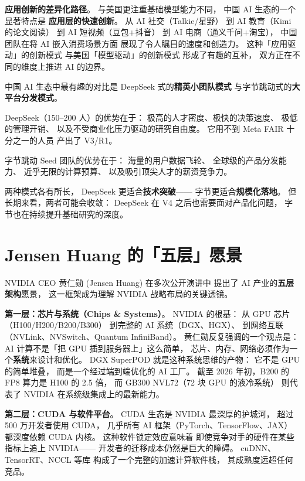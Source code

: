 \textbf{应用创新的差异化路径}。
与美国更注重基础模型能力不同，
中国 AI 生态的一个显著特点是
\textbf{应用层的快速创新}。
从 AI 社交（Talkie/星野）
到 AI 教育（Kimi 的论文阅读）
到 AI 短视频（豆包+抖音）
到 AI 电商（通义千问+淘宝），
中国团队在将 AI 嵌入消费场景方面
展现了令人瞩目的速度和创造力。
这种「应用驱动」的创新模式
与美国「模型驱动」的创新模式
形成了有趣的互补，
双方正在不同的维度上推进 AI 的边界。

\begin{keybox}
中国 AI 生态中最有趣的对比是
DeepSeek 式的\textbf{精英小团队模式}
与字节跳动式的\textbf{大平台分发模式}。

DeepSeek（150--200 人）的优势在于：
极高的人才密度、极快的决策速度、
极低的管理开销、
以及不受商业化压力驱动的研究自由度。
它用不到 Meta FAIR 十分之一的人员
产出了 V3/R1。

字节跳动 Seed 团队的优势在于：
海量的用户数据飞轮、
全球级的产品分发能力、
近乎无限的计算预算、
以及吸引顶尖人才的薪资竞争力。

两种模式各有所长，
DeepSeek 更适合\textbf{技术突破}——
字节更适合\textbf{规模化落地}。
但长期来看，两者可能会收敛：
DeepSeek 在 V4 之后也需要面对产品化问题，
字节也在持续提升基础研究的深度。
\end{keybox}

\section{Jensen Huang 的「五层」愿景}
\label{sec:jensen-five-layers}

NVIDIA CEO 黄仁勋 (Jensen Huang) 在多次公开演讲中
提出了 AI 产业的\textbf{五层架构}愿景，
这一框架成为理解 NVIDIA 战略布局的关键透镜。

\textbf{第一层：芯片与系统（Chips \& Systems）}。
NVIDIA 的根基：
从 GPU 芯片（H100/H200/B200/B300）
到完整的 AI 系统（DGX、HGX）、
到网络互联（NVLink、NVSwitch、Quantum InfiniBand）。
黄仁勋反复强调的一个观点是：
AI 计算不是「把 GPU 插到服务器上」这么简单，
芯片、内存、网络必须作为一个\textbf{系统}来设计和优化。
DGX SuperPOD 就是这种系统思维的产物：
它不是 GPU 的简单堆叠，
而是一个经过端到端优化的 AI 工厂。
截至 2026 年初，B200 的 FP8 算力是 H100 的 2.5 倍，
而 GB300 NVL72（72 块 GPU 的液冷系统）
则代表了 NVIDIA 在系统级集成上的最新能力。

\textbf{第二层：CUDA 与软件平台}。
CUDA 生态是 NVIDIA 最深厚的护城河，
超过 500 万开发者使用 CUDA，
几乎所有 AI 框架（PyTorch、TensorFlow、JAX）
都深度依赖 CUDA 内核。
这种软件锁定效应意味着
即使竞争对手的硬件在某些指标上追上 NVIDIA——
开发者的迁移成本仍然是巨大的障碍。
cuDNN、TensorRT、NCCL 等库
构成了一个完整的加速计算软件栈，
其成熟度远超任何竞品。

